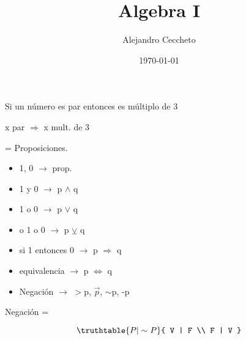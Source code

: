 \documentclass{article}
\title{Algebra I}
\date{\today}
\author{Alejandro Ceccheto}
\begin{document}
	\maketitle
	\pagebreak
	
	

	\begin{frm-thm}
		Si un número es par entonces es múltiplo de 3 \\
		\begin{center}
			x par $\Rightarrow$ x mult. de 3
		\end{center}
	\end{frm-thm}


	
	
	
\begin{multicols}{3}
	\begin{minipage}[t]{0.5\textwidth}
		 = Proposiciones. \\
		
		\begin{itemize}
			\item 1, 0 $\rightarrow$ prop. \\
			
			\item 1 y 0 $\rightarrow$ p $\land$ q\\
			
			\item 1 o 0 $\rightarrow$ p $\lor$ q \\
			
			\item o 1 o 0 $\rightarrow$ p $\veebar$ q \\
			
			\item si 1 entonces 0 $\rightarrow$ p $\Longrightarrow$ q \\
			
			\item equivalencia $\rightarrow$ p $\Longleftrightarrow$ q \\
			
			\item Negación $\rightarrow$  $>$p, $\vec{p}$, $\sim$p, -p \\
		\end{itemize}
	\end{minipage}
	
	Negación =
	\begin{minipage}{0.5cm}
		\[
		\truthtable{
			P | \sim P
		}{
			V | F \\
			F | V
		}
		\]
	\end{minipage}
	

\end{multicols}
\end{document}
